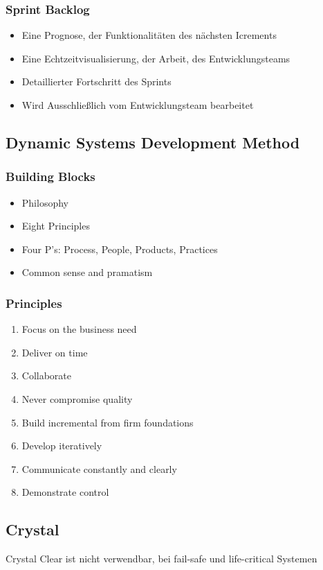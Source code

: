 \subsubsection{Sprint Backlog}
\begin{itemize}
	\item Eine Prognose, der Funktionalitäten des nächsten Icrements
	\item Eine Echtzeitvisualisierung, der Arbeit, des Entwicklungsteams
	\item Detaillierter Fortschritt des Sprints
	\item Wird Ausschließlich vom Entwicklungsteam bearbeitet
\end{itemize}
\subsection{Dynamic Systems Development Method}
\subsubsection{Building Blocks}
\begin{itemize}
	\item Philosophy
	\item Eight Principles
	\item Four P's: Process, People, Products, Practices
	\item Common sense and pramatism
\end{itemize}
\subsubsection{Principles}
\begin{enumerate}
	\item Focus on the business need
	\item Deliver on time
	\item Collaborate
	\item Never compromise quality
	\item Build incremental from firm foundations
	\item Develop iteratively
	\item Communicate constantly and clearly
	\item Demonstrate control
\end{enumerate}
\subsection{Crystal}
Crystal Clear ist nicht verwendbar, bei fail-safe und life-critical Systemen
